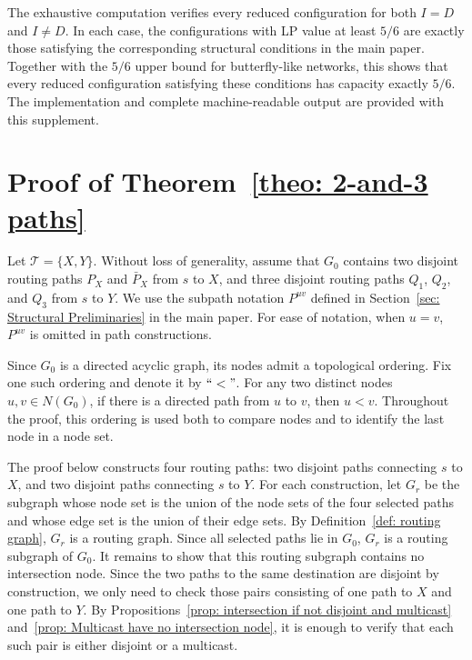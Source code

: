 \documentclass[11pt]{article}
\begin{document}
The exhaustive computation verifies every reduced configuration for both \(I=D\) and \(I\neq D\). In each case, the configurations with LP value at least \(5/6\) are exactly those satisfying the corresponding structural conditions in the main paper. Together with the \(5/6\) upper bound for butterfly-like networks, this shows that every reduced configuration satisfying these conditions has capacity exactly \(5/6\). The implementation and complete machine-readable output are provided with this supplement.

\section{Proof of Theorem~\ref{theo: 2-and-3 paths}}\label{Appendix: Proof_of_three_path_disjoint}

Let \(\mathcal T=\{X,Y\}\). Without loss of generality, assume that \(G_0\) contains two disjoint routing paths \(P_X\) and \(\bar P_X\) from \(s\) to \(X\), and three disjoint routing paths \(Q_1\), \(Q_2\), and \(Q_3\) from \(s\) to \(Y\).
We use the subpath notation \(P^{uv}\) defined in Section~\ref{sec: Structural Preliminaries} in the main paper. For ease of notation, when \(u=v\), \(P^{uv}\) is omitted in path constructions.

Since \(G_0\) is a directed acyclic graph, its nodes admit a topological ordering. Fix one such ordering and denote it by \(``<"\). For any two distinct nodes \(u,v\in N(G_0)\), if there is a directed path from \(u\) to \(v\), then \(u<v\). Throughout the proof, this ordering is used both to compare nodes and to identify the last node in a node set.

The proof below constructs four routing paths: two disjoint paths connecting \(s\) to \(X\), and two disjoint paths connecting \(s\) to \(Y\). For each construction, let \(G_r\) be the subgraph whose node set is the union of the node sets of the four selected paths and whose edge set is the union of their edge sets. By Definition~\ref{def: routing graph}, \(G_r\) is a routing graph. Since all selected paths lie in \(G_0\), \(G_r\) is a routing subgraph of \(G_0\). It remains to show that this routing subgraph contains no intersection node. Since the two paths to the same destination are disjoint by construction, we only need to check those pairs consisting of one path to \(X\) and one path to \(Y\). By Propositions~\ref{prop: intersection if not disjoint and multicast} and~\ref{prop: Multicast have no intersection node}, it is enough to verify that each such pair is either disjoint or a multicast.
\end{document}
